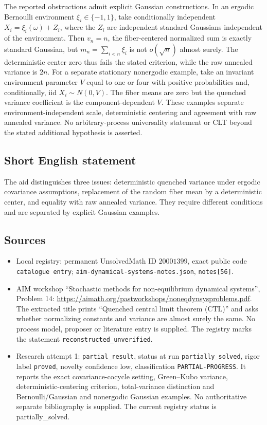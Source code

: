 \documentclass[11pt]{article}
\begin{document}
The reported obstructions admit explicit Gaussian constructions. In an ergodic Bernoulli environment \(\xi_i\in\{-1,1\}\), take conditionally independent \(X_i=\xi_i(\omega)+Z_i\), where the \(Z_i\) are independent standard Gaussians independent of the environment. Then \(v_n=n\), the fiber-centered normalized sum is exactly standard Gaussian, but \(m_n=\sum_{i<n}\xi_i\) is not \(o(\sqrt n)\) almost surely. The deterministic center zero thus fails the stated criterion, while the raw annealed variance is \(2n\). For a separate stationary nonergodic example, take an invariant environment parameter \(V\) equal to one or four with positive probabilities and, conditionally, iid \(X_i\sim N(0,V)\). The fiber means are zero but the quenched variance coefficient is the component-dependent \(V\). These examples separate environment-independent scale, deterministic centering and agreement with raw annealed variance. No arbitrary-process universality statement or CLT beyond the stated additional hypothesis is asserted.
\subsection{Short English statement}
The aid distinguishes three issues: deterministic quenched variance under ergodic covariance assumptions, replacement of the random fiber mean by a deterministic center, and equality with raw annealed variance. They require different conditions and are separated by explicit Gaussian examples.
\subsection{Sources}
\begin{itemize}
\item Local registry: permanent UnsolvedMath ID \(20001399\), exact public code \texttt{catalogue entry}; \texttt{aim-dynamical-systems-notes.json}, \texttt{notes[56]}.
\item AIM workshop ``Stochastic methods for non-equilibrium dynamical systems'', Problem 14: \url{https://aimath.org/pastworkshops/noneqdynsysproblems.pdf}. The extracted title prints ``Quenched central limit theorem (CTL)'' and asks whether normalizing constants and variance are almost surely the same. No process model, proposer or literature entry is supplied. The registry marks the statement \texttt{reconstructed\_unverified}.
\item Research attempt 1: \texttt{partial\_result}, status at run \texttt{partially\_solved}, rigor label \texttt{proved}, novelty confidence low, classification \texttt{PARTIAL-PROGRESS}. It reports the exact covariance-cocycle setting, Green--Kubo variance, deterministic-centering criterion, total-variance distinction and Bernoulli/Gaussian and nonergodic Gaussian examples. No authoritative separate bibliography is supplied. The current registry status is partially_solved.
\end{itemize}
\end{document}
